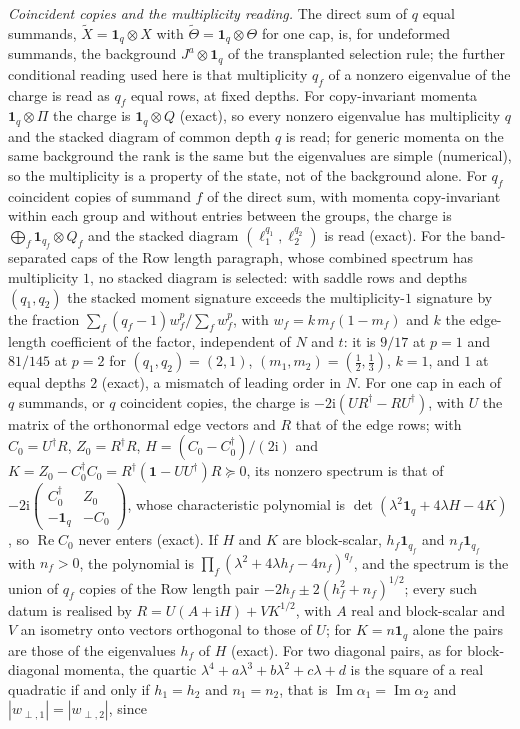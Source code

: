 \emph{Coincident copies and the multiplicity reading.} The direct sum of \(q\) equal summands, \(\widetilde X=\mathbf 1_q\otimes X\) with \(\widetilde\Theta=\mathbf 1_q\otimes\Theta\) for one cap, is, for undeformed summands, the background \(J^a\otimes\mathbf 1_q\) of the transplanted selection rule; the further conditional reading used here is that multiplicity \(q_f\) of a nonzero eigenvalue of the charge is read as \(q_f\) equal rows, at fixed depths. For copy-invariant momenta \(\mathbf 1_q\otimes\Pi\) the charge is \(\mathbf 1_q\otimes Q\) (exact), so every nonzero eigenvalue has multiplicity \(q\) and the stacked diagram of common depth \(q\) is read; for generic momenta on the same background the rank is the same but the eigenvalues are simple (numerical), so the multiplicity is a property of the state, not of the background alone. For \(q_f\) coincident copies of summand \(f\) of the direct sum, with momenta copy-invariant within each group and without entries between the groups, the charge is \(\bigoplus_f\mathbf 1_{q_f}\otimes Q_f\) and the stacked diagram \((\ell_1^{q_1},\ell_2^{q_2})\) is read (exact). For the band-separated caps of the Row length paragraph, whose combined spectrum has multiplicity \(1\), no stacked diagram is selected: with saddle rows and depths \((q_1,q_2)\) the stacked moment signature exceeds the multiplicity-\(1\) signature by the fraction \(\sum_f(q_f-1)w_f^p/\sum_fw_f^p\), with \(w_f=k\,m_f(1-m_f)\) and \(k\) the edge-length coefficient of the factor, independent of \(N\) and \(t\): it is \(9/17\) at \(p=1\) and \(81/145\) at \(p=2\) for \((q_1,q_2)=(2,1)\), \((m_1,m_2)=(\tfrac12,\tfrac13)\), \(k=1\), and \(1\) at equal depths \(2\) (exact), a mismatch of leading order in \(N\). For one cap in each of \(q\) summands, or \(q\) coincident copies, the charge is \(-2\mathrm i(UR^\dagger-RU^\dagger)\), with \(U\) the matrix of the orthonormal edge vectors and \(R\) that of the edge rows; with \(C_0=U^\dagger R\), \(Z_0=R^\dagger R\), \(H=(C_0-C_0^\dagger)/(2\mathrm i)\) and \(K=Z_0-C_0^\dagger C_0=R^\dagger(\mathbf 1-UU^\dagger)R\succeq0\), its nonzero spectrum is that of \(-2\mathrm i\left(\begin{smallmatrix}C_0^\dagger&Z_0\\-\mathbf 1_q&-C_0\end{smallmatrix}\right)\), whose characteristic polynomial is \(\det(\lambda^2\mathbf 1_q+4\lambda H-4K)\), so \(\operatorname{Re}C_0\) never enters (exact). If \(H\) and \(K\) are block-scalar, \(h_f\mathbf 1_{q_f}\) and \(n_f\mathbf 1_{q_f}\) with \(n_f>0\), the polynomial is \(\prod_f(\lambda^2+4\lambda h_f-4n_f)^{q_f}\), and the spectrum is the union of \(q_f\) copies of the Row length pair \(-2h_f\pm2(h_f^2+n_f)^{1/2}\); every such datum is realised by \(R=U(A+\mathrm iH)+VK^{1/2}\), with \(A\) real and block-scalar and \(V\) an isometry onto vectors orthogonal to those of \(U\); for \(K=n\mathbf 1_q\) alone the pairs are those of the eigenvalues \(h_f\) of \(H\) (exact). For two diagonal pairs, as for block-diagonal momenta, the quartic \(\lambda^4+a\lambda^3+b\lambda^2+c\lambda+d\) is the square of a real quadratic if and only if \(h_1=h_2\) and \(n_1=n_2\), that is \(\operatorname{Im}\alpha_1=\operatorname{Im}\alpha_2\) and \(|w_{\perp,1}|=|w_{\perp,2}|\), since 